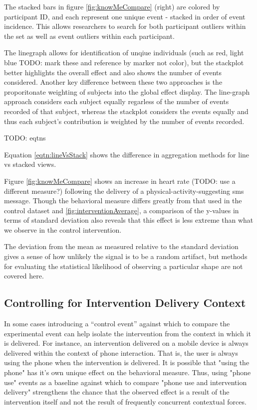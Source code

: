 \documentclass[review,journal]{vgtc}         %
\begin{document}
The stacked bars in figure \ref{fig:knowMeCompare} (right) are colored by participant ID, and each represent one unique event - stacked in order of event incidence.
This allows researchers to search for both participant outliers within the set as well as event outliers within each participant.

The linegraph allows for identification of unqiue individuals (such as red, light blue TODO: mark these and reference by marker not color), but the stackplot better highlights the overall effect and also shows the number of events considered.
Another key difference between these two approaches is the proporitonate weighting of subjects into the global effect display.
The line-graph approach considers each subject equally regarless of the number of events recorded of that subject, whereas the stackplot considers the events equally and thus each subject's contribution is weighted by the number of events recorded.

TODO: eqtns

Equation \ref{eqtn:lineVsStack} shows the difference in aggregation methods for line vs stacked views.

Figure \ref{fig:knowMeCompare} shows an increase in heart rate (TODO: use a different measure?) following the delivery of a physical-activity-suggesting sms message.
Though the behavioral measure differs greatly from that used in the control dataset and \ref{fig:interventionAverage}, a comparison of the y-values in terms of standard deviation also reveals that this effect is less extreme than what we observe in the control intervention.

The deviation from the mean as measured relative to the standard deviation gives a sense of how unlikely the signal is to be a random artifact, but methods for evaluating the statistical likelihood of observing a particular shape are not covered here.

\subsection{Controlling for Intervention Delivery Context}
In some cases introducing a “control event” against which to compare the experimental event can help isolate the intervention from the context in which it is delivered.
For instance, an intervention delivered on a mobile device is always delivered within the context of phone interaction.
That is, the user is always using the phone when the intervention is delivered.
It is possible that "using the phone" has it's own unique effect on the behavioral measure.
Thus, using "phone use" events as a baseline against which to compare "phone use and intervention delivery" strengthens the chance that the observed effect is a result of the intervention itself and not the result of frequently concurrent contextual forces.
\end{document}
